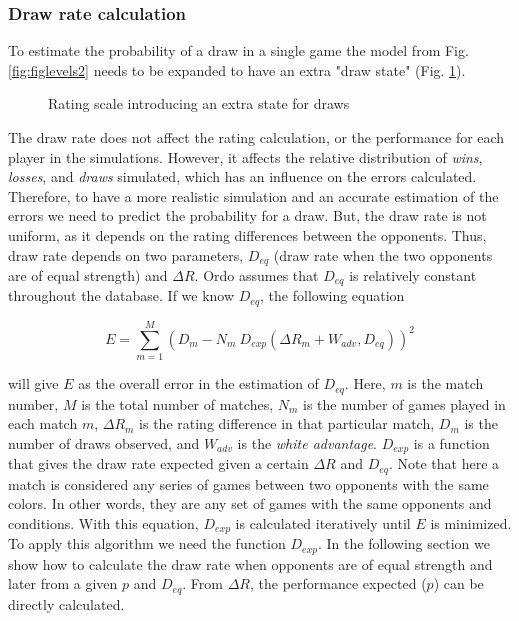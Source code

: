 \documentclass[12pt]{article}
\begin{document}

\subsubsection*{Draw rate calculation}

To estimate the probability of a draw in a single game the model from Fig. \ref{fig:figlevels2} needs to be expanded to have an extra "draw state" (Fig. \ref{fig:threestates}).

	\begin{figure}[htb]
	\caption{\label{fig:threestates} Rating scale introducing an extra state for draws}
	\end{figure}


The draw rate does not affect the rating calculation, or the performance for each player in the simulations.
However, it affects the relative distribution of \textit{wins}, \textit{losses}, and \textit{draws} simulated, which has an influence on the errors calculated. 
Therefore, to have a more realistic simulation and an accurate estimation of the errors we need to predict the probability for a draw.
But, the draw rate is not uniform, as it depends on the rating differences between the opponents.
Thus, draw rate depends on two parameters, $D_{eq}$ (draw rate when the two opponents are of equal strength) and $\Delta R$.
Ordo assumes that $D_{eq}$ is relatively constant throughout the database.
If we know $D_{eq}$, the following equation

	\begin{equation} \label{eq:draw_rate_errors}
	E = \sum\limits_{m=1}^M (D_{m} - N_{m}\: D_{exp}(\Delta R_{m} + W_{adv}, D_{eq}))^2
	\end{equation}

will give $E$ as the overall error in the estimation of $D_{eq}$. 
Here, $m$ is the match number, $M$ is the total number of matches, $N_{m}$ is the number of games played in each match $m$, $\Delta R_{m}$ is the rating difference in that particular match, $D_{m}$ is the number of draws observed, and $W_{adv}$ is the \textit{white advantage}.
$D_{exp}$ is a function that gives the draw rate expected given a certain $\Delta R$ and $D_{eq}$. 
Note that here a match is considered any series of games between two opponents with the same colors. 
In other words, they are any set of games with the same opponents and conditions.
With this equation, $D_{exp}$ is calculated iteratively until $E$ is minimized. 
To apply this algorithm we need the function $D_{exp}$. 
In the following section we show how to calculate the draw rate when opponents are of equal strength and later from a given $p$ and $D_{eq}$.
From $\Delta R$, the performance expected ($p$) can be directly calculated.
\end{document}
